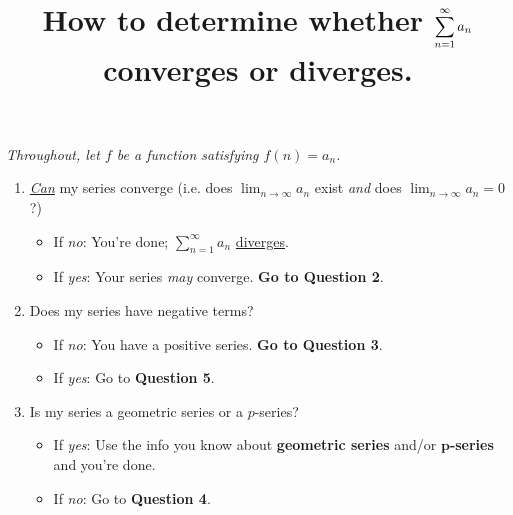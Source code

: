 \documentclass[10pt]{article}
\title{\vspace{-0.75in}\Large{How to determine whether $\displaystyle\ser$ converges or diverges.}\vspace{-0.75in}}
\date{}
\newcommand{\infsum}[3]{\sum_{{#1}={#2}}^\infty {#3}}
\newcommand{\ser}{\infsum{n}{1}{a_n}}
\begin{document}
	\maketitle
	\vspace{-0.125in}
	\begin{center}
	\textit{Throughout, let $f$ be a function satisfying $f(n)=a_n$.}
	\end{center}

	\begin{enumerate}
		\item \textit{\ul{Can}} my series converge (i.e. does $\lim_{n\to\infty} a_n$ exist \textit{and} does $\lim_{n\to\infty}a_n=0$?)%
			\begin{itemize}
					\item If \textit{no}: You're done; $\textstyle\ser$ \ul{diverges}.
					\item If \textit{yes}: Your series \textit{may} converge. \textbf{Go to Question 2}.
			\end{itemize}
	
		\item Does my series have negative terms?
			\begin{itemize}
				\item If \textit{no}: You have a positive series. \textbf{Go to Question 3}.
				\item If \textit{yes}: Go to \textbf{Question 5}.
			\end{itemize}
		
		\item Is my series a geometric series or a $p$-series?
			\begin{itemize}
				\item If \textit{yes}: Use the info you know about \textbf{geometric series} and/or \textbf{$\boldsymbol{p}$-series} and you're done.
				\item If \textit{no}: Go to \textbf{Question 4}.
			\end{itemize}
		

\end{enumerate}
\end{document}

